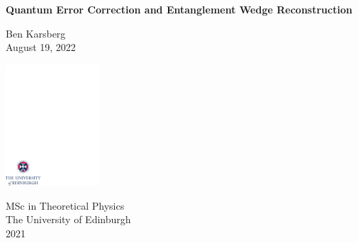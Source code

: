 \documentclass[12pt,a4paper]{report}
\begin{document}
\thispagestyle{empty}

%

\parindent=0pt          %
\parskip=5pt            %


\vspace*{0.1\textheight}

\begin{center}
        \huge{\bfseries Quantum Error Correction and Entanglement Wedge Reconstruction}\\
\end{center}

\bigskip

\begin{center}
        \large{Ben Karsberg}\\  %
        \bigskip
        \large{August 19, 2022}  %
\end{center}


\vspace*{0.3\textheight}

\begin{center}
        \includegraphics[width=35mm]{crest.pdf}
\end{center}

\medskip

\begin{center}

\large{
  MSc in Theoretical Physics\\[0.8ex]
  The University of Edinburgh\\[0.8ex]
  2021
}

\end{center}
\end{document}

